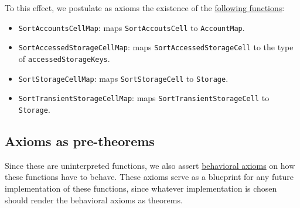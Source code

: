 To this effect, we postulate as axioms the existence of the
\href{https://runtimeverification.github.io/evm-equivalence/docs/EvmEquivalence/Interfaces/Axioms.html}{following
  functions}:

\begin{itemize}
\item \texttt{SortAccountsCellMap}: maps \texttt{SortAccoutsCell} to
  \texttt{AccountMap}.
\item \texttt{SortAccessedStorageCellMap}: maps \texttt{SortAccessedStorageCell}
  to the type of \texttt{accessedStorageKeys}.
\item \texttt{SortStorageCellMap}: maps \texttt{SortStorageCell} to
  \texttt{Storage}.
\item \texttt{SortTransientStorageCellMap}: maps
  \texttt{SortTransientStorageCell} to \texttt{Storage}.
\end{itemize}

\subsection{Axioms as pre-theorems}

Since these are uninterpreted functions, we also assert
\href{https://runtimeverification.github.io/evm-equivalence/docs/EvmEquivalence/StateMap.html#Axioms.findAccountInAccountCellMap}{behavioral
  axioms} on how these functions have to behave. These axioms serve as a
blueprint for any future implementation of these functions, since whatever
implementation is chosen should render the behavioral axioms as theorems.
